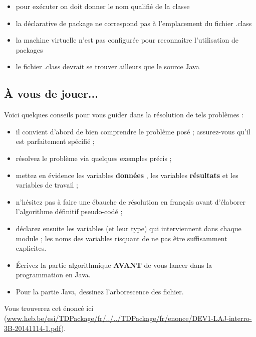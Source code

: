 \documentclass[11pt,a4paper]{article}
\begin{document}
            \par
        
            \begin{itemize} 
        
            \item[ \ding{"6D} ] pour ex\'ecuter on doit donner le nom qualifi\'e de la classe
        
            \item[ \ding{"6D} ] la d\'eclarative de package ne correspond pas \`a l'emplacement du fichier .class
        
            \item[ \ding{"6D} ] la machine virtuelle n'est pas configur\'ee pour reconnaitre l'utilisation de packages
        
            \item[ \ding{"6D} ] le fichier .class devrait se trouver ailleurs que le source Java
        
            \end{itemize} 
        \subsection{\`A vous de jouer...}
          Voici quelques conseils pour vous guider dans la r\'esolution de tels probl\`emes :
          
					\begin{itemize}
				
			\item il convient d'abord de bien comprendre le probl\`eme pos\'e ; assurez-vous qu'il est parfaitement sp\'ecifi\'e ;
			\item r\'esolvez le probl\`eme via quelques exemples pr\'ecis ;
			\item mettez en \'evidence les variables \textbf{\guillemotleft  donn\'ees \guillemotright }, les variables \textbf{\guillemotleft  r\'esultats \guillemotright } et les variables de travail ;
			\item n'h\'esitez pas \`a faire une \'ebauche de r\'esolution en fran\c cais avant d'\'elaborer l'algorithme d\'efinitif pseudo-cod\'e ;
			\item d\'eclarez ensuite les variables (et leur type) qui interviennent dans chaque module ; les noms des variables risquant de ne pas \^etre suffisamment explicites.
			\item \'Ecrivez la partie algorithmique \textbf{AVANT} de vous lancer dans la programmation en Java.
			\item Pour la partie Java, dessinez l'arborescence des fichier. 
					\end{itemize}
				
            \par
        
          Vous trouverez cet \'enonc\'e ici (\url{www.heb.be/esi/TDPackage/fr/../../TDPackage/fr/enonce/DEV1-LAJ-interro-3B-20141114-1.pdf}).
        
            \par
        
				
\end{document}
